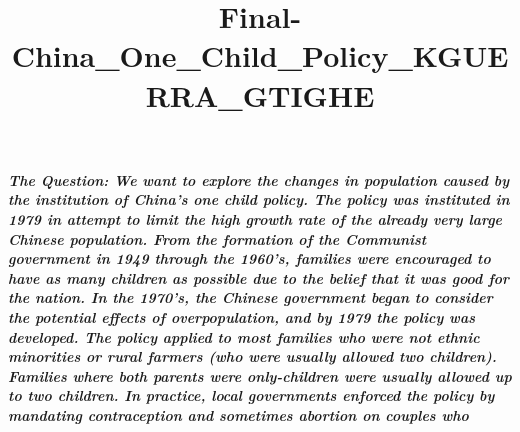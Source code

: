 \documentclass[11pt]{article}
\title{Final-China\_One\_Child\_Policy\_KGUERRA\_GTIGHE}
\begin{document}
    
    
    \maketitle
    
    

    
    \hypertarget{the-question-we-want-to-explore-the-changes-in-population-caused-by-the-institution-of-chinas-one-child-policy.-the-policy-was-instituted-in-1979-in-attempt-to-limit-the-high-growth-rate-of-the-already-very-large-chinese-population.-from-the-formation-of-the-communist-government-in-1949-through-the-1960s-families-were-encouraged-to-have-as-many-children-as-possible-due-to-the-belief-that-it-was-good-for-the-nation.-in-the-1970s-the-chinese-government-began-to-consider-the-potential-effects-of-overpopulation-and-by-1979-the-policy-was-developed.-the-policy-applied-to-most-families-who-were-not-ethnic-minorities-or-rural-farmers-who-were-usually-allowed-two-children.-families-where-both-parents-were-only-children-were-usually-allowed-up-to-two-children.-in-practice-local-governments-enforced-the-policy-by-mandating-contraception-and-sometimes-abortion-on-couples-who-had-already-had-their-one-child.-the-societal-effects-of-this-practice-are-fairly-well-documented-abortions-were-disproportionately-used-when-expecting-females-and-female-children-were-neglected-or-abandoned.-what-is-less-agreed-upon-and-what-we-plan-to-study-is-whether-the-policy-was-effective-in-reducing-chinas-population-growth-rate.-we-will-study-this-question-by-projecting-the-population-of-china-over-the-time-period-of-the-one-child-policy-relative-to-similar-countries-and-comparing-the-predicted-population-with-the-historical-data.}{%
\subparagraph{The Question: We want to explore the changes in population
caused by the institution of China's one child policy. The policy was
instituted in 1979 in attempt to limit the high growth rate of the
already very large Chinese population. From the formation of the
Communist government in 1949 through the 1960's, families were
encouraged to have as many children as possible due to the belief that
it was good for the nation. In the 1970's, the Chinese government began
to consider the potential effects of overpopulation, and by 1979 the
policy was developed. The policy applied to most families who were not
ethnic minorities or rural farmers (who were usually allowed two
children). Families where both parents were only-children were usually
allowed up to two children. In practice, local governments enforced the
policy by mandating contraception and sometimes abortion on couples who
}}
\end{document}
